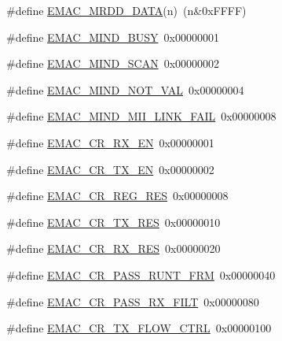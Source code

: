 \begin{DoxyCompactItemize}
\#define \hyperlink{group___e_m_a_c___private___macros_ga971e2174cbbc59086a4a2ed8346a07f0}{\-E\-M\-A\-C\-\_\-\-M\-R\-D\-D\-\_\-\-D\-A\-T\-A}(n)~(n\&0x\-F\-F\-F\-F)
\item 
\#define \hyperlink{group___e_m_a_c___private___macros_ga0cd77b33f5c92c618a99c419f14809b6}{\-E\-M\-A\-C\-\_\-\-M\-I\-N\-D\-\_\-\-B\-U\-S\-Y}~0x00000001
\item 
\#define \hyperlink{group___e_m_a_c___private___macros_ga8079f02ecafda3f5a9b8ac6dce0eb558}{\-E\-M\-A\-C\-\_\-\-M\-I\-N\-D\-\_\-\-S\-C\-A\-N}~0x00000002
\item 
\#define \hyperlink{group___e_m_a_c___private___macros_ga0c08472e5ce7690cf0c4074a2926d3ad}{\-E\-M\-A\-C\-\_\-\-M\-I\-N\-D\-\_\-\-N\-O\-T\-\_\-\-V\-A\-L}~0x00000004
\item 
\#define \hyperlink{group___e_m_a_c___private___macros_ga51616381a1d53f0f810d4781819fad60}{\-E\-M\-A\-C\-\_\-\-M\-I\-N\-D\-\_\-\-M\-I\-I\-\_\-\-L\-I\-N\-K\-\_\-\-F\-A\-I\-L}~0x00000008
\item 
\#define \hyperlink{group___e_m_a_c___private___macros_gaf8cc86b979d7a2ec7650c2b49743db83}{\-E\-M\-A\-C\-\_\-\-C\-R\-\_\-\-R\-X\-\_\-\-E\-N}~0x00000001
\item 
\#define \hyperlink{group___e_m_a_c___private___macros_ga16f39934be084f9cfd0760cac9612c3e}{\-E\-M\-A\-C\-\_\-\-C\-R\-\_\-\-T\-X\-\_\-\-E\-N}~0x00000002
\item 
\#define \hyperlink{group___e_m_a_c___private___macros_ga80d00b11636e69d095d914e415fa5a1e}{\-E\-M\-A\-C\-\_\-\-C\-R\-\_\-\-R\-E\-G\-\_\-\-R\-E\-S}~0x00000008
\item 
\#define \hyperlink{group___e_m_a_c___private___macros_gabd209ec9e17f13b5f31fa55007011022}{\-E\-M\-A\-C\-\_\-\-C\-R\-\_\-\-T\-X\-\_\-\-R\-E\-S}~0x00000010
\item 
\#define \hyperlink{group___e_m_a_c___private___macros_ga82c0b530953c72d5c0c1b4313fbee9d5}{\-E\-M\-A\-C\-\_\-\-C\-R\-\_\-\-R\-X\-\_\-\-R\-E\-S}~0x00000020
\item 
\#define \hyperlink{group___e_m_a_c___private___macros_ga43b97c6aa427bb7a4fe6a3390faebbe7}{\-E\-M\-A\-C\-\_\-\-C\-R\-\_\-\-P\-A\-S\-S\-\_\-\-R\-U\-N\-T\-\_\-\-F\-R\-M}~0x00000040
\item 
\#define \hyperlink{group___e_m_a_c___private___macros_ga9e09677e261b091b3618ba266c559587}{\-E\-M\-A\-C\-\_\-\-C\-R\-\_\-\-P\-A\-S\-S\-\_\-\-R\-X\-\_\-\-F\-I\-L\-T}~0x00000080
\item 
\#define \hyperlink{group___e_m_a_c___private___macros_ga2b150c8cd7a7470d5778893ac47ddb57}{\-E\-M\-A\-C\-\_\-\-C\-R\-\_\-\-T\-X\-\_\-\-F\-L\-O\-W\-\_\-\-C\-T\-R\-L}~0x00000100

\end{DoxyCompactItemize}
